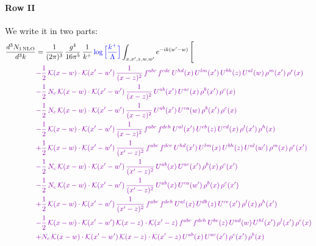 \documentclass[10pt]{article}
\numberwithin{equation}{section}
\newcommand{\new}[1]{{\color{blue}#1}}
\begin{document}
\paragraph{Row II}
We write it in two parts:
\begin{align}
\frac{d^{3}N_{1\,\mathrm{NLO}}}{d^{3}k} & = \frac{1}{(2\pi)^{3}}\,\frac{g^{4}}{16\pi^{5}}\,\frac{1}{k^{+}}\,\new{\log\Big[\frac{k^{+}}{\Lambda}\Big]}\int_{x,x',z,w,w'}e^{-ik(w'-w)}\,\Bigg[\notag\\ &{\color{CC} -\frac{1}{2}\,\mathcal{K}(x-w)\cdot\mathcal{K}(x'-w')\,\frac{1}{(x-z)^{2}}\,f^{abc}\,f^{cde}\,U^{hd}(x)\,U^{lm}(x')\,U^{bh}(z)\,U^{al}(w)\,\rho^{m}(x')\,\rho^{e}(x)} \notag\\
&{\color{CC} -\frac{1}{2}\,N_{c}\,\mathcal{K}(x-w)\cdot\mathcal{K}(x'-w')\,\frac{1}{(x-z)^{2}}\,U^{ab}(x')\,U^{ac}(x)\,\rho^{b}(x')\,\rho^{c}(x)} \notag\\
&{\color{CC} -\frac{1}{2}\,N_{c}\,\mathcal{K}(x-w)\cdot\mathcal{K}(x'-w')\,\frac{1}{(x-z)^{2}}\,U^{ab}(x')\,U^{ca}(w)\,\rho^{b}(x')\,\rho^{c}(x)} \notag\\
&{\color{CC} -\frac{1}{2}\,\mathcal{K}(x-w)\cdot\mathcal{K}(x'-w')\,\frac{1}{(x-z)^{2}}\,f^{abc}\,f^{deh}\,U^{al}(x')\,U^{eb}(z)\,U^{cd}(x)\,\rho^{l}(x')\,\rho^{h}(x)} \notag\\
&{\color{CC} +\frac{1}{2}\,\mathcal{K}(x-w)\cdot\mathcal{K}(x'-w')\,\frac{1}{(x'-z)^{2}}\,f^{abc}\,f^{dce}\,U^{hd}(x')\,U^{lm}(x)\,U^{bh}(z)\,U^{al}(w')\,\rho^{m}(x)\,\rho^{e}(x')} \notag\\
&{\color{CC} -\frac{1}{2}\,N_{c}\,\mathcal{K}(x-w)\cdot\mathcal{K}(x'-w')\,\frac{1}{(x'-z)^{2}}\,U^{ab}(x)\,U^{ac}(x')\,\rho^{b}(x)\,\rho^{c}(x')} \notag\\
&{\color{CC} -\frac{1}{2}\,N_{c}\,\mathcal{K}(x-w)\cdot\mathcal{K}(x'-w')\,\frac{1}{(x'-z)^{2}}\,U^{ab}(x)\,U^{ca}(w')\,\rho^{b}(x)\,\rho^{c}(x')} \notag\\
&{\color{CC} +\frac{1}{2}\,\mathcal{K}(x-w)\cdot\mathcal{K}(x'-w')\,\frac{1}{(x'-z)^{2}}\,f^{abc}\,f^{deh}\,U^{al}(x)\,U^{db}(z)\,U^{ce}(x')\,\rho^{l}(x)\,\rho^{h}(x')} \notag\\
&{\color{CC} -\frac{1}{2}\,\mathcal{K}(x-w)\cdot\mathcal{K}(x'-w')\,\mathcal{K}(x-z)\cdot\mathcal{K}(x'-z)\,f^{abc}\,f^{deh}\,U^{be}(z)\,U^{ad}(w)\,U^{hl}(x')\,\rho^{l}(x')\,\rho^{c}(x)} \notag\\
&{\color{CC} +N_{c}\,\mathcal{K}(x-w)\cdot\mathcal{K}(x'-w')\,\mathcal{K}(x-z)\cdot\mathcal{K}(x'-z)\,U^{ab}(x)\,U^{ac}(x')\,\rho^{c}(x')\,\rho^{b}(x)} \notag\\

\end{align}
\end{document}
